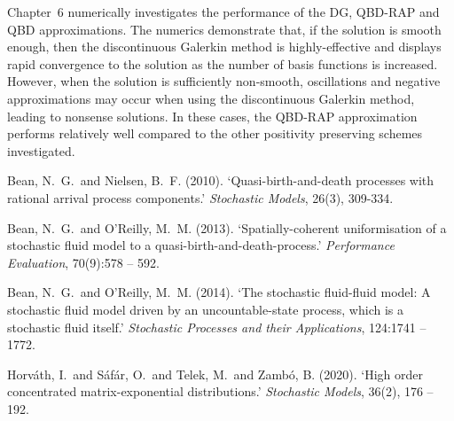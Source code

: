 \documentclass[a4paper]{article}
\begin{document}
Chapter~6 numerically investigates the performance of the DG, QBD-RAP and QBD approximations. The numerics demonstrate that, if the solution is smooth enough, then the discontinuous Galerkin method is highly-effective and displays rapid convergence to the solution as the number of basis functions is increased. However, when the solution is sufficiently non-smooth, oscillations and negative approximations may occur when using the discontinuous Galerkin method, leading to nonsense solutions. In these cases, the QBD-RAP approximation performs relatively well compared to the other positivity preserving schemes investigated.

\begin{thebibliography}{9}
    Bean, N.~G.~and Nielsen, B.~F. (2010). {`Quasi-birth-and-death processes with rational arrival process components.}' \textit{Stochastic Models}, 26(3), 309-334.

    Bean, N.~G.~and O'Reilly, M.~M. (2013). {`Spatially-coherent uniformisation of a stochastic fluid model to a quasi-birth-and-death-process.'} \textit{Performance Evaluation}, 70(9):578 -- 592.

    Bean, N.~G.~and O'Reilly, M.~M. (2014). {`The stochastic fluid-fluid model: A stochastic fluid model driven by an uncountable-state process, which is a stochastic fluid itself.'} \textit{Stochastic Processes and their Applications}, 124:1741 -- 1772.

    Horv\'ath, I.~and S\'af\'ar, O.~and Telek, M.~and Zamb\'o, B. (2020). `{High order concentrated matrix-exponential distributions.}' \textit{Stochastic Models}, 36(2), 176 -- 192.
\end{thebibliography}
\end{document}
